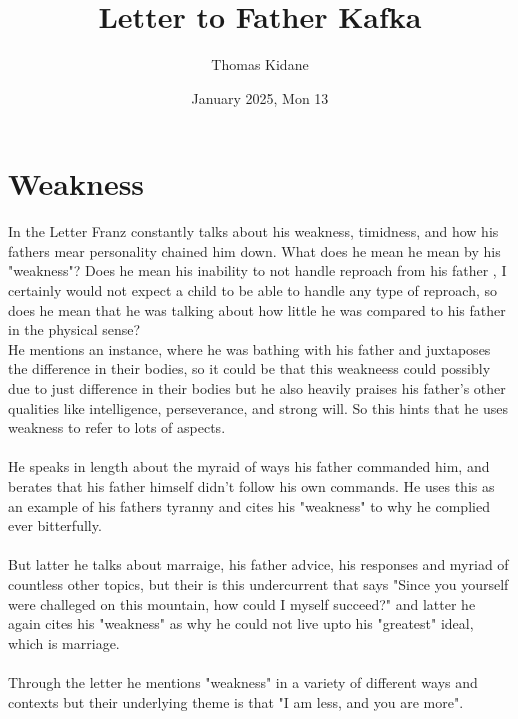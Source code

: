 \documentclass{article}
\title{Letter to Father Kafka}
\author{Thomas Kidane}
\date{January 2025, Mon 13}
\begin{document}
\maketitle

\section{Weakness}

In the Letter Franz constantly talks about his weakness, timidness, and how his fathers mear personality chained him down.
What does he mean he mean by his "weakness"? Does he mean his inability to not handle reproach from his father
, I certainly would not expect a child to be able to handle any type of reproach, so does he mean 
that he was talking about how little he was compared to his father in the physical sense?
\newline
\\
He mentions an instance, where he was bathing with his father and juxtaposes the difference in their bodies, so it could be 
that this weakneess could possibly due to just difference in their bodies but he also heavily praises his father's other qualities
like intelligence, perseverance, and strong will. So this hints that he uses weakness to refer to lots of aspects.
\\
\\
He speaks in length about the myraid of ways his father commanded him, and berates that his father himself didn't follow his own commands.
He uses this as an example of his fathers tyranny and cites his "weakness" to why he complied ever bitterfully.
\\
\\
But latter he talks about marraige, his father advice, his responses and myriad of countless other topics, but their is this undercurrent that says "Since you yourself
were challeged on this mountain, how could I myself succeed?" and latter he again cites his "weakness" as why he could not live upto 
his "greatest" ideal, which is marriage.
\\
\\
Through the letter he mentions "weakness" in a variety of different ways and contexts but their underlying theme is that "I am less, and you are more". 
\end{document}
